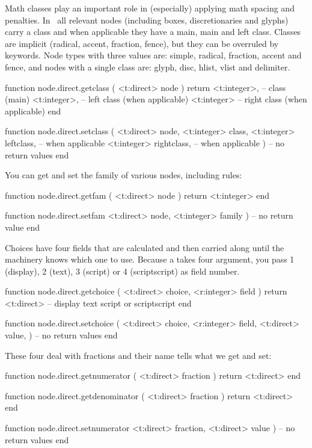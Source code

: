 Math classes play an important role in (especially) applying math spacing and
penalties. In \LUAMETATEX\ all relevant nodes (including boxes, discretionaries
and glyphs) carry a class and when applicable they have a main, main and left
class. Classes are implicit (radical, accent, fraction, fence), but they can be
overruled by keywords. Node types with three values are: simple, radical,
fraction, accent and fence, and nodes with a single class are: glyph, disc,
hlist, vlist and delimiter.

\starttyping[option=LUA]
function node.direct.getclass ( <t:direct> node )
    return
        <t:integer>, -- class       (main)
        <t:integer>, -- left class  (when applicable)
        <t:integer>  -- right class (when applicable)
end

function node.direct.setclass (
    <t:direct>  node,
    <t:integer> class,
    <t:integer> leftclass,  -- when applicable
    <t:integer> rightclass, -- when applicable
)
    -- no return values
end
\stoptyping

You can get and set the family of various nodes, including rules:

\starttyping[option=LUA]
function node.direct.getfam ( <t:direct> node )
    return <t:integer>
end

function node.direct.setfam
    <t:direct>  node,
    <t:integer> family
)
     -- no return value
end
\stoptyping

Choices have four fields that are calculated and then carried along until the
machinery knows which one to use. Because a  takes four
argument, you pass 1 (display), 2 (text), 3 (script) or 4 (scriptscript) as field
number.

\starttyping[option=LUA]
function node.direct.getchoice (
    <t:direct>  choice,
    <r:integer> field
)
    return <t:direct> -- display text script or scriptscript
end

function node.direct.setchoice (
    <t:direct>  choice,
    <r:integer> field,
    <t:direct>  value,
)
    -- no return values
end
\stoptyping

These four deal with fractions and their name tells what we get and set:

\starttyping[option=LUA]
function node.direct.getnumerator ( <t:direct> fraction )
    return <t:direct>
end

function node.direct.getdenominator ( <t:direct> fraction )
    return <t:direct>
end

function node.direct.setnumerator
    <t:direct> fraction,
    <t:direct> value
)
    -- no return values
end

